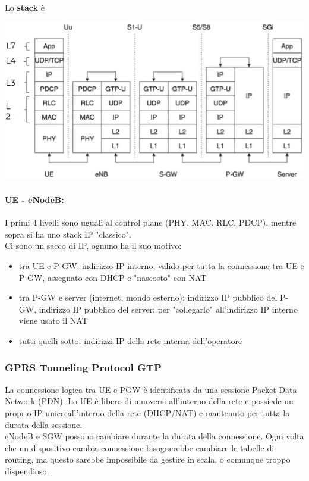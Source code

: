 Lo \textbf{stack} è 
\begin{center}
	\includegraphics[width=0.9\linewidth]{img/4g/ups}
\end{center}

\paragraph{UE - eNodeB:} I primi 4 livelli sono uguali al control plane (PHY, MAC, RLC, PDCP), mentre sopra si ha uno stack IP "classico".\\

Ci sono un sacco di IP, ognuno ha il suo motivo: 
\begin{itemize}
	\item tra UE e P-GW: indirizzo IP interno, valido per tutta la connessione tra UE e P-GW, assegnato con DHCP e "nascosto" con NAT
	\item tra P-GW e server (internet, mondo esterno): indirizzo IP pubblico del P-GW, indirizzo IP pubblico del server; per "collegarlo" all'indirizzo IP interno viene usato il NAT
	\item tutti quelli sotto: indirizzi IP della rete interna dell'operatore
\end{itemize}

\newpage

\subsubsection{GPRS Tunneling Protocol GTP} 

La connessione logica tra UE e PGW è identificata da una sessione Packet Data Network (PDN).  Lo UE è libero di muoversi all'interno della rete e possiede un proprio IP unico all'interno della rete (DHCP/NAT) e mantenuto per tutta la durata della sessione. \\

eNodeB e SGW possono cambiare durante la durata della connessione. Ogni volta che un dispositivo cambia connessione bisognerebbe cambiare le tabelle di routing, ma questo sarebbe impossibile da gestire in scala, o comunque troppo dispendioso. \\

